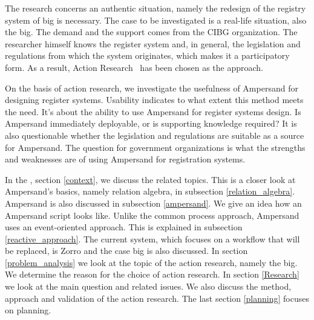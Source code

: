 The research concerns an authentic situation, namely the redesign of the registry system of \acrshort{big} is necessary.
The case to be investigated is a real-life situation, also the \acrshort{big}.
The demand and the support comes from the CIBG organization.
The researcher himself knows the register system and, in general, the legislation and regulations from which the system originates, which makes it a participatory form.
As a result, Action Research~\citep{Easterbrook} has been chosen as the approach.

On the basis of action research, we investigate the usefulness of Ampersand for designing register systems.
Usability indicates to what extent this method meets the need.
It's about the ability to use Ampersand for register systems design.
Is Ampersand immediately deployable, or is supporting knowledge required?
It is also questionable whether the legislation and regulations are suitable as a source for Ampersand.
The question for government organizations is what the strengths and weaknesses are of using Ampersand for registration systems.

In the , section \ref{context}, we discuss the related topics.
This is a closer look at Ampersand's basics, namely relation algebra, in subsection \ref{relation_algebra}.
Ampersand is also discussed in subsection \ref{ampersand}.
We give an idea how an Ampersand script looks like.
Unlike the common process approach, Ampersand uses an event-oriented approach.
This is explained in subsection \ref{reactive_approach}.
The current system, which focuses on a workflow that will be replaced, is Zorro and the case \acrshort{big} is also discussed.
In section \ref{problem_analysis} we look at the topic of the action research, namely the \acrshort{big}.
We determine the reason for the choice of action research.
In section \ref{Research} we look at the main question and related issues.
We also discuss the method, approach and validation of the action research.
The last section \ref{planning} focuses on planning.


